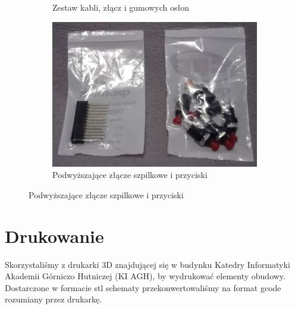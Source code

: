 \begin{figure}[H]
\begin{subfigure}{0.32\textwidth}
        \caption*{Zestaw kabli, złącz i gumowych osłon}
    \end{subfigure}
    \begin{subfigure}{0.32\textwidth}
        \centering
        \includegraphics[width=0.9\linewidth]{photos/buttons.png}
        \caption*{Podwyższające złącze szpilkowe i przyciski}
    \end{subfigure}
\end{figure}

\section{Drukowanie}\label{sec:cover_printing}

Skorzystaliśmy z drukarki 3D znajdującej się w budynku Katedry Informatyki Akademii Górniczo
Hutniczej (KI AGH), by wydrukować elementy obudowy. Dostarczone w formacie stl schematy
przekonwertowaliśmy na format gcode rozumiany przez drukarkę.

